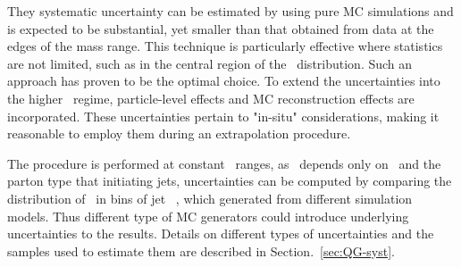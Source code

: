 They systematic uncertainty can be estimated by using pure MC simulations and is expected to be substantial, yet smaller than that obtained from data at the edges of the mass range. This technique is particularly effective where statistics are not limited, such as in the central region of the \pt\ distribution. Such an approach has proven to be the optimal choice. To extend the uncertainties into the higher \pt\ regime, particle-level effects and MC reconstruction effects are incorporated. These uncertainties pertain to "in-situ" considerations, making it reasonable to employ them during an extrapolation procedure.

The procedure is performed at constant \pt\ ranges, as \ntrk~depends only on \pt\ and the parton type that initiating jets, uncertainties can be computed by comparing the distribution of \ntrk~in bins of jet \pt~, which generated from different simulation models. Thus different type of MC generators could introduce underlying uncertainties to the results. Details on different types of uncertainties and the samples used to estimate them are described in Section.~\ref{sec:QG-syst}. 


%
%
%
